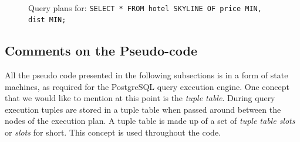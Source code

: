 \begin{figure}[htbp]
{\begin{minipage}[b]{\onecolumnwidth}
\end{minipage}
\label{fig:qp-sfs-ef}%
}%
%
\\
%
%
\hspace{\columnsep}%
%
%
\caption{Query plans for: 
\texttt{SELECT * FROM hotel SKYLINE OF price MIN, dist MIN;}}%
\end{figure}


\subsection{Comments on the Pseudo-code}
All the pseudo code presented in the following subsections is in a
form of state machines, as required for the PostgreSQL query execution
engine.  One concept that we would like to mention at this point is the
\emph{tuple table}.  During query execution tuples are stored in a
tuple table when passed around between the nodes of the execution plan.
A tuple table is made up of a set of \emph{tuple table slots} or \emph{slots}
for short.  This concept is used throughout the code.


